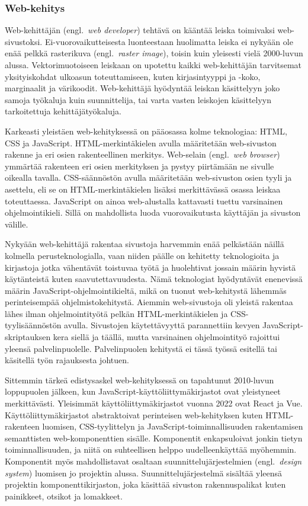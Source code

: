 \documentclass[finnish, 12pt, a4paper, elec, utf8, a-1b, online]{aaltothesis}
\begin{document}
\subsubsection{Web-kehitys}

Web-kehittäjän (engl.~\textit{web developer}) tehtävä on kääntää leiska
toimivaksi web-sivustoksi. Ei-vuorovaikutteisesta luonteestaan huolimatta leiska
ei nykyään ole enää pelkkä rasterikuva (engl.~\textit{raster image}), toisin
kuin yleisesti vielä 2000-luvun alussa. Vektorimuotoiseen leiskaan on upotettu
kaikki web-kehittäjän tarvitsemat yksityiskohdat ulkoasun toteuttamiseen, kuten
kirjasintyyppi ja -koko, marginaalit ja värikoodit. Web-kehittäjä hyödyntää
leiskan käsittelyyn joko samoja työkaluja kuin suunnittelija, tai varta vasten
leiskojen käsittelyyn tarkoitettuja kehittäjätyökaluja.

Karkeasti yleistäen web-kehityksessä on pääosassa kolme teknologiaa: HTML, CSS
ja JavaScript. HTML-merkintäkielen avulla määritetään web-sivuston rakenne ja
eri osien rakenteellinen merkitys. Web-selain (engl.~\textit{web browser})
ymmärtää rakenteen eri osien merkityksen ja pystyy piirtämään ne sivulle
oikealla tavalla. CSS-säännöstön avulla määritetään web-sivuston osien tyyli ja
asettelu, eli se on HTML-merkintäkielen lisäksi merkittävässä osassa leiskaa
toteuttaessa. JavaScript on ainoa web-alustalla kattavasti tuettu varsinainen
ohjelmointikieli. Sillä on mahdollista luoda vuorovaikutusta käyttäjän ja
sivuston välille.

Nykyään web-kehittäjä rakentaa sivustoja harvemmin enää pelkästään näillä
kolmella perusteknologialla, vaan niiden päälle on kehitetty teknologioita ja
kirjastoja jotka vähentävät toistuvaa työtä ja huolehtivat jossain määrin
hyvistä käytänteistä kuten saavutettavuudesta. Nämä teknologiat hyödyntävät
enenevissä määrin JavaScript-ohjelmointikieltä, mikä on tuonut web-kehitystä
lähemmäs perinteisempää ohjelmistokehitystä. Aiemmin web-sivustoja oli yleistä
rakentaa lähes ilman ohjelmointityötä pelkän HTML-merkintäkielen ja
CSS-tyylisäännöstön avulla. Sivustojen käytettävyyttä parannettiin kevyen
JavaScript-skriptauksen kera siellä ja täällä, mutta varsinainen ohjelmointityö
rajoittui yleensä palvelinpuolelle. Palvelinpuolen kehitystä ei tässä työssä
esitellä tai käsitellä työn rajauksesta johtuen.

Sittemmin tärkeä edistysaskel web-kehityksessä on tapahtunut 2010-luvun
loppupuolen jälkeen, kun JavaScript-käyttöliittymäkirjastot ovat yleistyneet
merkittävästi. Yleisimmät käyttöliittymäkirjastot vuonna 2022 ovat React ja Vue.
Käyttöliittymäkirjastot abstraktoivat perinteisen web-kehityksen kuten
HTML-rakenteen luomisen, CSS-tyylittelyn ja JavaScript-toiminnallisuuden
rakentamisen semanttisten web-komponenttien sisälle. Komponentit enkapsuloivat
jonkin tietyn toiminnallisuuden, ja niitä on suhteellisen helppo
uudelleenkäyttää myöhemmin. Komponentit myös mahdollistavat osaltaan
suunnittelujärjestelmien (engl.~\textit{design system}) luomisen jo projektin
alussa. Suunnittelujärjestelmä sisältää yleensä projektin komponenttikirjaston,
joka käsittää sivuston rakennuspalikat kuten painikkeet, otsikot ja lomakkeet.
\end{document}
